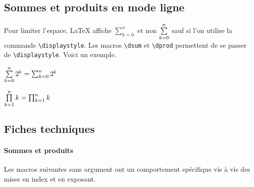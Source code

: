 \documentclass[12pt,a4paper]{article}
\begin{document}

\subsection{Sommes et produits en mode ligne}

Pour limiter l'espace, \LaTeX{} affiche $\sum_{k=0}^{n}$ et non $\sum\limits_{k=0}^{n}$ sauf si l'on utilise la commande \verb+\displaystyle+.
Les macros \verb+\dsum+ et \verb+\dprod+ permettent de se passer de \verb+\displaystyle+.
Voici un exemple.


\begin{latexex}
$\sum\limits_{k=0}^{n} 2^k =
 \sum_{k=0}^{n} 2^k$

$\prod\limits_{k=1}^{n} k =
 \prod_{k=1}^{n} k$
\end{latexex}




\subsection{Fiches techniques}

\paragraph{Sommes et produits}

Les macros suivantes sans argument ont un comportement spécifique vis à vis des mises en index et en exposant. 


\separation



\end{document}
